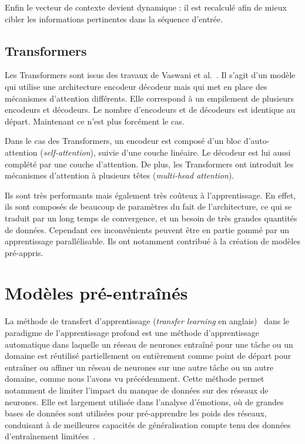 Enfin le vecteur de contexte devient dynamique : il est recalculé afin de mieux cibler les informations pertinentes dans la séquence d'entrée.

\subsection{Transformers}

Les Transformers sont issus des travaux de Vaswani et al.~\cite{Vaswani2017}. Il s’agit d’un modèle qui utilise une architecture encodeur décodeur mais qui met en place des mécanismes d’attention différents. Elle correspond à un empilement de plusieurs encodeurs et décodeurs. Le nombre d’encodeurs et de décodeurs est identique au départ. Maintenant ce n'est plus forcément le cas.

Dans le cas des Transformers, un encodeur est composé d’un bloc d’auto-attention (\textit{self-attention}), suivie d’une couche linéaire. Le décodeur est lui aussi complété par une couche d’attention. De plus, les Transformers ont introduit les mécanismes d’attention à plusieurs têtes (\textit{multi-head attention}).

Ils sont très performants mais également très coûteux à l'apprentissage. En effet, ils sont composés de beaucoup de paramètres du fait de l'architecture, ce qui se traduit par un long temps de convergence, et un besoin de très grandes quantités de données. Cependant ces inconvénients peuvent être en partie gommé par un apprentissage parallélisable. Ils ont notamment contribué à la création de modèles pré-appris.


\section{Modèles pré-entraînés}

La méthode de transfert d'apprentissage (\textit{transfer learning} en anglais)~\cite{Goodfellow2016} dans le paradigme de l'apprentissage profond est une méthode d'apprentissage automatique dans laquelle un réseau de neurones entraîné pour une tâche ou un domaine est réutilisé partiellement ou entièrement comme point de départ pour entraîner ou affiner un réseau de neurones sur une autre tâche ou un autre domaine, comme nous l'avons vu précédemment. Cette méthode permet notamment de limiter l'impact du manque de données sur des réseaux de neurones.
Elle est largement utilisée dans l'analyse d'émotions, où de grandes bases de données sont utilisées pour pré-apprendre les poids des réseaux, conduisant à de meilleures capacités de généralisation compte tenu des données d’entraînement limitées~\cite{Dong2018}.

